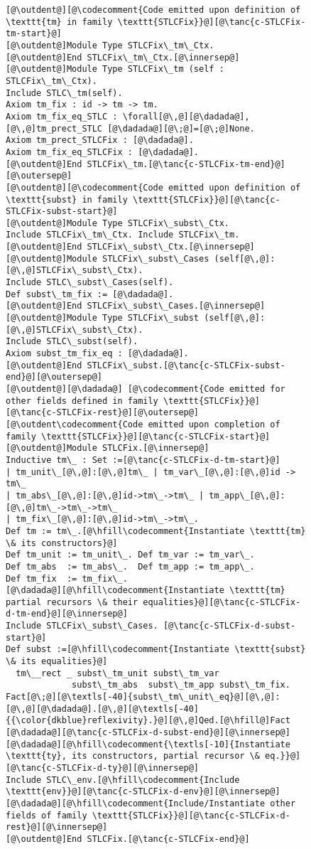 \begin{figure}
\begin{minipage}{\textwidth}
\begin{multicols}{2}
\begin{lstlisting}
[@\outdent@][@\codecomment{Code emitted upon definition of \texttt{tm} in family \texttt{STLCFix}}@][@\tanc{c-STLCFix-tm-start}@]
[@\outdent@]Module Type STLCFix\_tm\_Ctx.
[@\outdent@]End STLCFix\_tm\_Ctx.[@\innersep@]
[@\outdent@]Module Type STLCFix\_tm (self : STLCFix\_tm\_Ctx).
Include STLC\_tm(self).
Axiom tm_fix : id -> tm -> tm.
Axiom tm_fix_eq_STLC : \forall[@\,@][@\dadada@],[@\,@]tm_prect_STLC [@\dadada@][@\;@]=[@\;@]None.
Axiom tm_prect_STLCFix : [@\dadada@].
Axiom tm_fix_eq_STLCFix : [@\dadada@].
[@\outdent@]End STLCFix\_tm.[@\tanc{c-STLCFix-tm-end}@][@\outersep@]
[@\outdent@][@\codecomment{Code emitted upon definition of \texttt{subst} in family \texttt{STLCFix}}@][@\tanc{c-STLCFix-subst-start}@]
[@\outdent@]Module Type STLCFix\_subst\_Ctx.
Include STLCFix\_tm\_Ctx. Include STLCFix\_tm.
[@\outdent@]End STLCFix\_subst\_Ctx.[@\innersep@]
[@\outdent@]Module STLCFix\_subst\_Cases (self[@\,@]:[@\,@]STLCFix\_subst\_Ctx).
Include STLC\_subst\_Cases(self).
Def subst\_tm_fix := [@\dadada@].
[@\outdent@]End STLCFix\_subst\_Cases.[@\innersep@]
[@\outdent@]Module Type STLCFix\_subst (self[@\,@]:[@\,@]STLCFix\_subst\_Ctx).
Include STLC\_subst(self).
Axiom subst_tm_fix_eq : [@\dadada@].
[@\outdent@]End STLCFix\_subst.[@\tanc{c-STLCFix-subst-end}@][@\outersep@]
[@\outdent@][@\dadada@] [@\codecomment{Code emitted for other fields defined in family \texttt{STLCFix}}@][@\tanc{c-STLCFix-rest}@][@\outersep@]
[@\outdent\codecomment{Code emitted upon completion of family \texttt{STLCFix}}@][@\tanc{c-STLCFix-start}@]
[@\outdent@]Module STLCFix.[@\innersep@]
Inductive tm\_ : Set :=[@\tanc{c-STLCFix-d-tm-start}@]
| tm_unit\_[@\,@]:[@\,@]tm\_ | tm_var\_[@\,@]:[@\,@]id -> tm\_
| tm_abs\_[@\,@]:[@\,@]id->tm\_->tm\_ | tm_app\_[@\,@]:[@\,@]tm\_->tm\_->tm\_
| tm_fix\_[@\,@]:[@\,@]id->tm\_->tm\_.
Def tm := tm\_.[@\hfill\codecomment{Instantiate \texttt{tm} \& its constructors}@]
Def tm_unit := tm_unit\_. Def tm_var := tm_var\_.
Def tm_abs  := tm_abs\_.  Def tm_app := tm_app\_.
Def tm_fix  := tm_fix\_.
[@\dadada@][@\hfill\codecomment{Instantiate \texttt{tm} partial recursors \& their equalities}@][@\tanc{c-STLCFix-d-tm-end}@][@\innersep@]
Include STLCFix\_subst\_Cases. [@\tanc{c-STLCFix-d-subst-start}@]
Def subst :=[@\hfill\codecomment{Instantiate \texttt{subst} \& its equalities}@]
  tm\__rect _ subst\_tm_unit subst\_tm_var
             subst\_tm_abs  subst\_tm_app subst\_tm_fix.
Fact[@\;@][@\textls[-40]{subst\_tm\_unit\_eq}@][@\,@]:[@\,@][@\dadada@].[@\,@][@\textls[-40]{{\color{dkblue}reflexivity}.}@][@\,@]Qed.[@\hfill@]Fact [@\dadada@][@\tanc{c-STLCFix-d-subst-end}@][@\innersep@]
[@\dadada@][@\hfill\codecomment{\textls[-10]{Instantiate \texttt{ty}, its constructors, partial recursor \& eq.}}@][@\tanc{c-STLCFix-d-ty}@][@\innersep@]
Include STLC\_env.[@\hfill\codecomment{Include \texttt{env}}@][@\tanc{c-STLCFix-d-env}@][@\innersep@]
[@\dadada@][@\hfill\codecomment{Include/Instantiate other fields of family \texttt{STLCFix}}@][@\tanc{c-STLCFix-d-rest}@][@\innersep@]
[@\outdent@]End STLCFix.[@\tanc{c-STLCFix-end}@]
\end{lstlisting}


\end{multicols}
\end{minipage}
\end{figure}
